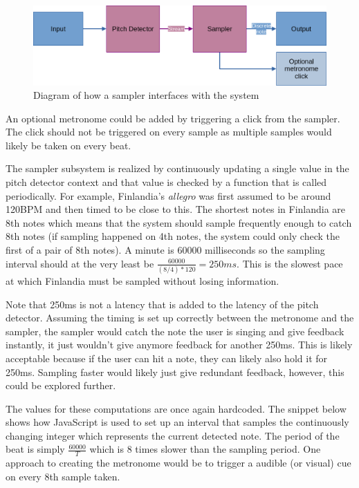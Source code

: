 \begin{figure}[ht]
    \centering
    \includegraphics[width=\textwidth]{./images/samplerArch.png}
    \caption{Diagram of how a sampler interfaces with the system\label{fig:samplerArch}}
\end{figure}

An optional metronome could be added by triggering a click from the sampler. The click should not be triggered on every sample as multiple samples would likely be taken on every beat. 

The sampler subsystem is realized by continuously updating a single value in the pitch detector context and that value is checked by a function that is called periodically. For example, Finlandia's \textit{allegro} was first assumed to be around 120BPM and then timed to be close to this. The shortest notes in Finlandia are 8th notes which means that the system should sample frequently enough to catch 8th notes (if sampling happened on 4th notes, the system could only check the first of a pair of 8th notes). A minute is 60000 milliseconds so the sampling interval should at the very least be $\frac{60000}{(8/4)*120} = 250ms$. This is the slowest pace at which Finlandia must be sampled without losing information.

Note that 250ms is not a latency that is added to the latency of the pitch detector. Assuming the timing is set up correctly between the metronome and the sampler, the sampler would catch the note the user is singing and give feedback instantly, it just wouldn't give anymore feedback for another 250ms. This is likely acceptable because if the user can hit a note, they can likely also hold it for 250ms. Sampling faster would likely just give redundant feedback, however, this could be explored further. 

The values for these computations are once again hardcoded. The snippet below shows how JavaScript is used to set up an interval that samples the continuously changing integer which represents the current detected note. The period of the beat is simply $\frac{60000}{T}$ which is 8 times slower than the sampling period. One approach to creating the metronome would be to  trigger a audible (or visual) cue on every 8th sample taken.  



